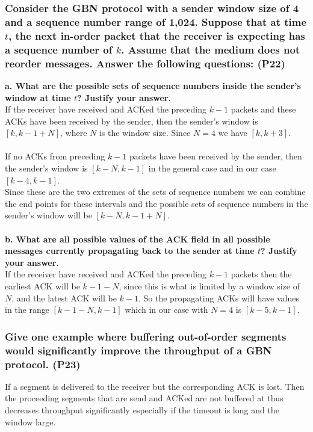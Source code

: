 \subsubsection{Consider the GBN protocol with a sender window size of 4 and a sequence number range of 1,024. Suppose that at time $t$, the next in-order packet that the receiver is expecting has a sequence number of $k$. Assume that the medium does not reorder messages. Answer the following questions: (P22)}

\textbf{a. What are the possible sets of sequence numbers inside the sender's window at time $t$? Justify your answer.} \\
If the receiver have received and ACKed the preceding $k-1$ packets and these ACKs have been received by the sender, then the sender's window is $[k, k - 1 + N]$, where $N$ is the window size. Since $N = 4$ we have $[k, k + 3]$. \\
\\
If no ACKs from preceding $k - 1$ packets have been received by the sender, then the sender's window is $[k - N, k - 1]$ in the general case and in our case $[k - 4, k - 1]$.
\\
Since these are the two extremes of the sets of sequence numbers we can combine the end points for these intervals and the possible sets of sequence numbers in the sender's window will be $[k - N, k - 1 + N]$. \\
\\
\textbf{b. What are all possible values of the ACK field in all possible messages currently propagating back to the sender at time $t$? Justify your answer.} \\
If the receiver have received and ACKed the preceding $k - 1$ packets then the earliest ACK will be $k - 1 - N$, since this is what is limited by a window size of $N$, and the latest ACK will be $k - 1$. So the propagating ACKs will have values in the range $[k - 1 - N, k - 1]$ which in our case with $N = 4$ is $[k - 5, k - 1]$.



\subsubsection{Give one example where buffering out-of-order segments would significantly improve the throughput of a GBN protocol. (P23)}

If a segment is delivered to the receiver but the corresponding ACK is lost. Then the proceeding segments that are send and ACKed are not buffered at thus decreases throughput significantly especially if the timeout is long and the window large.



